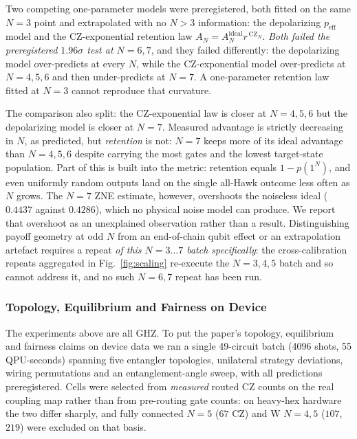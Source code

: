 \documentclass[conference,letterpaper,10pt]{IEEEtran}
\begin{document}
Two competing one-parameter models were preregistered, both
fitted on the same $N=3$ point and extrapolated with no $N>3$ information: the
depolarizing $p_{\mathrm{eff}}$ model and the CZ-exponential retention law
$A_N = A^{\mathrm{ideal}}_N r^{\,\mathrm{CZ}_N}$. \emph{Both failed the
preregistered $1.96\sigma$ test at $N=6,7$}, and they failed differently: the
depolarizing model over-predicts at every $N$, while the CZ-exponential model
over-predicts at $N=4,5,6$ and then under-predicts at $N=7$. A one-parameter
retention law fitted at $N=3$ cannot reproduce that curvature.

The comparison also split: the CZ-exponential law is closer at $N=4,5,6$
but the depolarizing model is closer at $N=7$. Measured advantage is strictly
decreasing in $N$, as predicted, but \emph{retention} is
not: $N=7$ keeps more of its ideal advantage than $N=4,5,6$ despite carrying
the most gates and the lowest target-state population. Part of this is built
into the metric: retention equals $1-p(1^N)$, and even uniformly random outputs
land on the single all-Hawk outcome less often as $N$ grows. The $N=7$ ZNE
estimate, however, overshoots the noiseless ideal ($0.4437$ against
$0.4286$), which no physical noise model can produce. We report that overshoot
as an unexplained observation rather than a result.
Distinguishing payoff geometry at odd $N$ from an end-of-chain qubit effect or
an extrapolation artefact requires a repeat \emph{of this $N=3\ldots7$ batch
specifically}: the cross-calibration repeats aggregated in
Fig.~\ref{fig:scaling} re-execute the $N=3,4,5$ batch and so cannot
address it, and no such $N=6,7$ repeat has been run.

\subsubsection{Topology, Equilibrium and Fairness on Device}\label{sec:hwtopology}
The experiments above are all GHZ. To put the paper's topology, equilibrium and
fairness claims on device data we ran a single 49-circuit batch (4096 shots,
55 QPU-seconds) spanning five entangler topologies, unilateral strategy
deviations, wiring permutations and an entanglement-angle sweep, with all
predictions preregistered. Cells were selected from
\emph{measured} routed CZ counts on the real coupling map rather than
from pre-routing gate counts: on heavy-hex hardware the two differ sharply, and
fully connected $N=5$ ($67$ CZ) and W $N=4,5$ ($107$, $219$) were
excluded on that basis.
\end{document}
